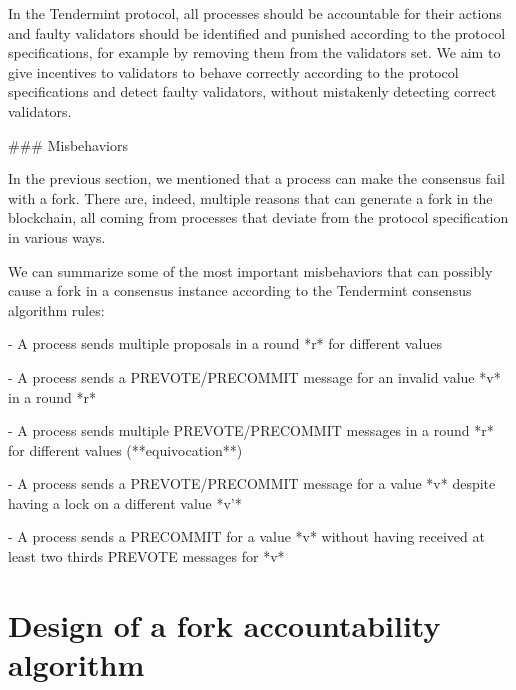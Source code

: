 \documentclass[a4paper,11pt,oneside]{report}
\begin{document}
\begin{markdown}
In the Tendermint protocol, all processes should be accountable for their actions and faulty validators should be identified and punished according to the protocol specifications, for example by removing them from the validators set.
We aim to give incentives to validators to behave correctly according to the protocol specifications and detect faulty validators, without mistakenly detecting correct validators. 
 
### Misbehaviors
 
In the previous section, we mentioned that a process can make the consensus fail with a fork. There are, indeed, multiple reasons that can generate a fork in the blockchain, all coming from processes that deviate from the protocol specification in various ways.

We can summarize some of the most important misbehaviors that can possibly cause a fork in a consensus instance according to the Tendermint consensus algorithm rules: 

- A process sends multiple proposals in a round *r* for different values 

- A process sends a PREVOTE/PRECOMMIT message for an invalid value *v* in a round *r*

- A process sends multiple PREVOTE/PRECOMMIT messages in a round *r* for different values (**equivocation**)

- A process sends a PREVOTE/PRECOMMIT message for a value *v* despite having a lock on a different value *v'*

- A process sends a PRECOMMIT for a value *v* without having received at least two thirds PREVOTE messages for *v* 

\end{markdown}

\chapter{Design of a fork accountability algorithm}
\end{document}
